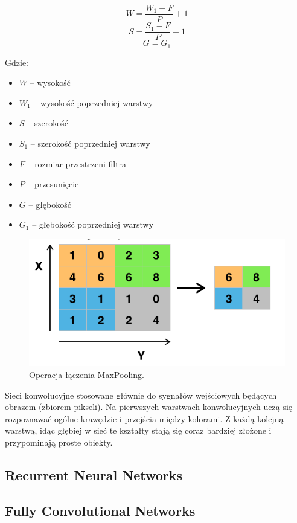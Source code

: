 \documentclass[12pt,a4paper,twoside,titlepage,openright]{book}
\begin{document}
$$ W = \frac{W_1 - F}{P} + 1 $$
$$ S = \frac{S_1 - F}{P} + 1 $$
$$ G = G_1 $$

Gdzie:
\begin{itemize}
\item $W$ -- wysokość
\item $W_1$ -- wysokość poprzedniej warstwy
\item $S$ -- szerokość
\item $S_1$ -- szerokość poprzedniej warstwy
\item $F$ -- rozmiar przestrzeni filtra
\item $P$ -- przesunięcie
\item $G$ -- głębokość
\item $G_1$ -- głębokość poprzedniej warstwy
\end{itemize}

\begin{figure}[ht]
	\centering
			\includegraphics[resolution=100, scale=0.6]{MaxPooling.png}
		\caption{Operacja łączenia MaxPooling.}
\end{figure}

Sieci konwolucyjne stosowane głównie do sygnałów wejściowych będących obrazem (zbiorem pikseli). Na pierwszych warstwach konwolucyjnych uczą się rozpoznawać ogólne krawędzie i przejścia między kolorami. Z każdą kolejną warstwą, idąc głębiej w sieć te kształty stają się coraz bardziej złożone i przypominają proste obiekty.

\subsection{Recurrent Neural Networks}

\subsection{Fully Convolutional Networks}
\end{document}
